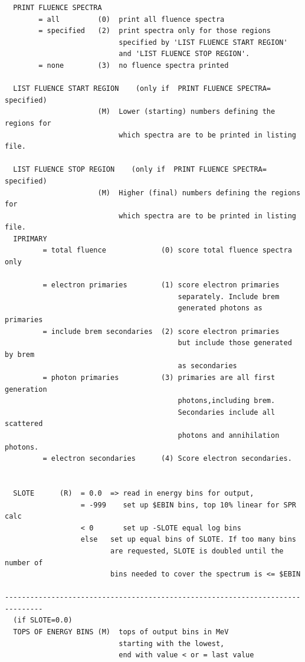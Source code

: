 \documentclass[12pt,twoside]{article}  %
\begin{document}
\begin{verbatim} 
  PRINT FLUENCE SPECTRA
        = all         (0)  print all fluence spectra 
        = specified   (2)  print spectra only for those regions
                           specified by 'LIST FLUENCE START REGION'
                           and 'LIST FLUENCE STOP REGION'.
        = none        (3)  no fluence spectra printed

  LIST FLUENCE START REGION    (only if  PRINT FLUENCE SPECTRA= specified)
                      (M)  Lower (starting) numbers defining the regions for
                           which spectra are to be printed in listing file.

  LIST FLUENCE STOP REGION    (only if  PRINT FLUENCE SPECTRA= specified)
                      (M)  Higher (final) numbers defining the regions for
                           which spectra are to be printed in listing file.   
  IPRIMARY
         = total fluence             (0) score total fluence spectra  only

         = electron primaries        (1) score electron primaries
                                         separately. Include brem
                                         generated photons as primaries
         = include brem secondaries  (2) score electron primaries 
                                         but include those generated by brem
                                         as secondaries
         = photon primaries          (3) primaries are all first generation
                                         photons,including brem.
                                         Secondaries include all scattered
                                         photons and annihilation photons.
         = electron secondaries      (4) Score electron secondaries.


  SLOTE      (R)  = 0.0  => read in energy bins for output,
                  = -999    set up $EBIN bins, top 10% linear for SPR calc
                  < 0       set up -SLOTE equal log bins
                  else   set up equal bins of SLOTE. If too many bins
                         are requested, SLOTE is doubled until the number of
                         bins needed to cover the spectrum is <= $EBIN

-------------------------------------------------------------------------------
  (if SLOTE=0.0)
  TOPS OF ENERGY BINS (M)  tops of output bins in MeV
                           starting with the lowest,
                           end with value < or = last value
\end{verbatim}
\end{document}
